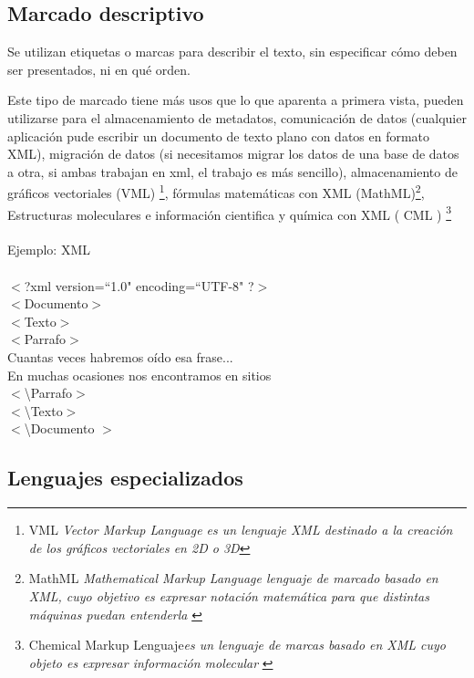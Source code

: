 \subsection{Marcado descriptivo}\label{marcado-descriptivo}

Se utilizan etiquetas o marcas para describir el texto, sin especificar cómo deben ser presentados, ni en qué orden.

Este tipo de marcado tiene más usos que lo que aparenta a primera vista, pueden utilizarse para el almacenamiento de metadatos, comunicación de datos (cualquier aplicación pude escribir un documento de texto plano con datos en formato XML), migración de datos (si necesitamos migrar los datos de una base de datos a otra, si ambas trabajan en xml, el trabajo es más sencillo), almacenamiento de gráficos vectoriales (VML) \footnote{VML \textit{Vector Markup Language es un lenguaje XML destinado a la creación de los gráficos vectoriales en 2D o 3D}\cite{vectorml}}, fórmulas matemáticas con XML (MathML)\footnote{MathML \textit{Mathematical Markup Language lenguaje de marcado basado en XML, cuyo objetivo es expresar notación matemática para que distintas máquinas puedan entenderla} \cite{xmlusos} \cite{mathmlwiki}}, Estructuras moleculares e información cientifica y química con XML ( CML ) \footnote{Chemical Markup Lenguaje\textit{es un lenguaje de marcas basado en XML cuyo objeto es expresar información molecular} \cite{chemicalml}} \cite{desarrollowebxml}
\\
\\
Ejemplo: XML
\\
\\
$<$?xml version=``1.0" encoding=``UTF-8" ?$>$
\\
$<$Documento$>$
\\
	 \tab $<$Texto$>$
	\\
		 \tab \tab $<$Parrafo$>$
		\\
			\tab\tab\tab Cuantas veces habremos oído esa frase...
			\\
			\tab\tab\tab En muchas ocasiones nos encontramos en sitios
			\\
		 \tab \tab $<$\textbackslash Parrafo$>$
		\\
	 \tab $<$\textbackslash Texto$>$
	\\
$<$\textbackslash Documento $>$


\subsection{Lenguajes especializados}\label{lenguajes-especializados}


